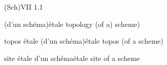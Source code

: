 
(Sch)\qquad VII 1.1

  (d'un schéma)\quad étale topology (of a) scheme)

topos étale (d'un schéma)\quad étale topos (of a scheme)

site étale d'un schéma\quad étale site of a scheme
